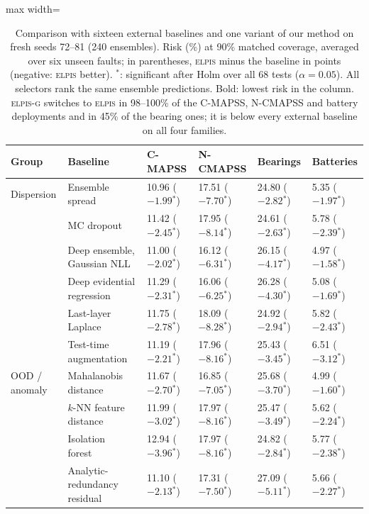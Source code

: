 \documentclass{esannV2}
\newcommand{\RPT}{\textsc{elpis}}
\newcommand{\AUTOD}{\textsc{elpis-g}}
\newcommand{\s}{$^{\ast}$}
\begin{document}
\begin{table}[!htbp]
\caption{Comparison with sixteen external baselines and one variant of our method on fresh seeds 72--81 (240 ensembles). Risk (\%) at 90\% matched coverage, averaged over six unseen faults; in parentheses, \RPT{} minus the baseline in points (negative: \RPT{} better). \s: significant after Holm over all 68 tests ($\alpha=0.05$). All selectors rank the same ensemble predictions. Bold: lowest risk in the column. \AUTOD{} switches to \RPT{} in 98--100\% of the C-MAPSS, N-CMAPSS and battery deployments and in 45\% of the bearing ones; it is below every external baseline on all four families.}
\label{tab:sota}
\centering\small
\begin{adjustbox}{max width=\textwidth}\begin{tabular}{llllll}
\toprule
Group & Baseline & C-MAPSS & N-CMAPSS & Bearings & Batteries\\
\midrule
Dispersion & Ensemble spread~\cite{lakshminarayanan2017simple} & 10.96 ($-1.99$\s) & 17.51 ($-7.70$\s) & 24.80 ($-2.82$\s) & 5.35 ($-1.97$\s)\\
 & MC dropout~\cite{gal2016dropout} & 11.42 ($-2.45$\s) & 17.95 ($-8.14$\s) & 24.61 ($-2.63$\s) & 5.78 ($-2.39$\s)\\
 & Deep ensemble, Gaussian NLL~\cite{lakshminarayanan2017simple} & 11.00 ($-2.02$\s) & 16.12 ($-6.31$\s) & 26.15 ($-4.17$\s) & 4.97 ($-1.58$\s)\\
 & Deep evidential regression~\cite{amini2020deep} & 11.29 ($-2.31$\s) & 16.06 ($-6.25$\s) & 26.28 ($-4.30$\s) & 5.08 ($-1.69$\s)\\
 & Last-layer Laplace~\cite{daxberger2021laplace} & 11.75 ($-2.78$\s) & 18.09 ($-8.28$\s) & 24.92 ($-2.94$\s) & 5.82 ($-2.43$\s)\\
 & Test-time augmentation~\cite{wang2019aleatoric} & 11.19 ($-2.21$\s) & 17.96 ($-8.16$\s) & 25.43 ($-3.45$\s) & 6.51 ($-3.12$\s)\\
OOD / anomaly & Mahalanobis distance~\cite{lee2018simple} & 11.67 ($-2.70$\s) & 16.85 ($-7.05$\s) & 25.68 ($-3.70$\s) & 4.99 ($-1.60$\s)\\
 & $k$-NN feature distance~\cite{sun2022out} & 11.99 ($-3.02$\s) & 17.97 ($-8.16$\s) & 25.47 ($-3.49$\s) & 5.62 ($-2.24$\s)\\
 & Isolation forest~\cite{liu2008isolation} & 12.94 ($-3.96$\s) & 17.97 ($-8.16$\s) & 24.82 ($-2.84$\s) & 5.77 ($-2.38$\s)\\
 & Analytic-redundancy residual~\cite{chow1984analytical} & 11.10 ($-2.13$\s) & 17.31 ($-7.50$\s) & 27.09 ($-5.11$\s) & 5.66 ($-2.27$\s)\\

\end{tabular}
\end{adjustbox}
\end{table}
\end{document}
